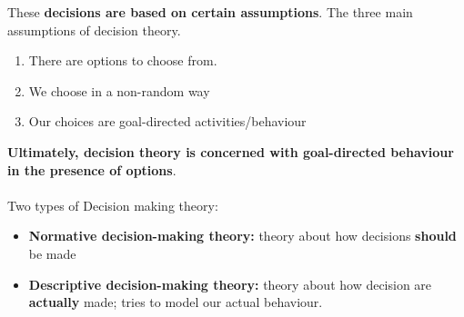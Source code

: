 \documentclass[12pt, a4paper]{article}
\begin{document}
These \textbf{decisions are based on certain assumptions}. The three main assumptions of 
decision theory.
\begin{enumerate}
    \item There are options to choose from.
    \item We choose in a non-random way
    \item Our choices are goal-directed activities/behaviour
\end{enumerate}

\textbf{Ultimately, decision theory is concerned with goal-directed behaviour in the
presence of options}.

\paragraph*{}
Two types of Decision making theory:
\begin{itemize}
    \item \textbf{Normative decision-making theory:} theory about how decisions \textbf{should} be made
    \item \textbf{Descriptive decision-making theory:} theory about how decision are \textbf{actually} made;
    tries to model our actual behaviour.
\end{itemize}
\end{document}
